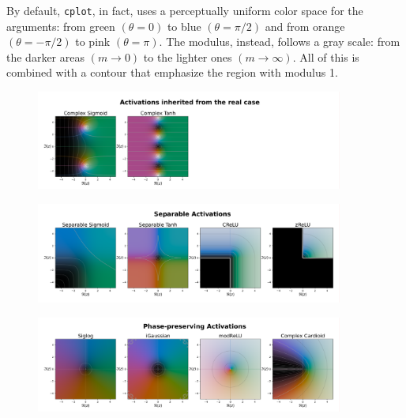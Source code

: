 \documentclass[../main.tex]{subfiles}
\begin{document}
By default, \texttt{cplot}, in fact, uses a perceptually uniform color space for the arguments: from green $(\theta=0)$ to blue $(\theta=\pi/2)$ and from orange $(\theta=-\pi/2)$ to pink $(\theta=\pi)$. The modulus, instead, follows a gray scale: from the darker areas $(m\to 0)$ to the lighter ones $(m\to\infty)$. All of this is combined with a contour that emphasize the region with modulus 1.\\

\begin{figure}[!h]
	\centering
	\includegraphics[width=0.9\textwidth]{pictures/cmplx_activations_1}
\end{figure}
\begin{figure}[!h]
	\centering
	\includegraphics[width=0.9\textwidth]{pictures/cmplx_activations_2}
\end{figure}
\begin{figure}[!t]
	\centering
	\includegraphics[width=0.9\textwidth]{pictures/cmplx_activations_3}
\end{figure}
\vspace*{3in}
\end{document}
